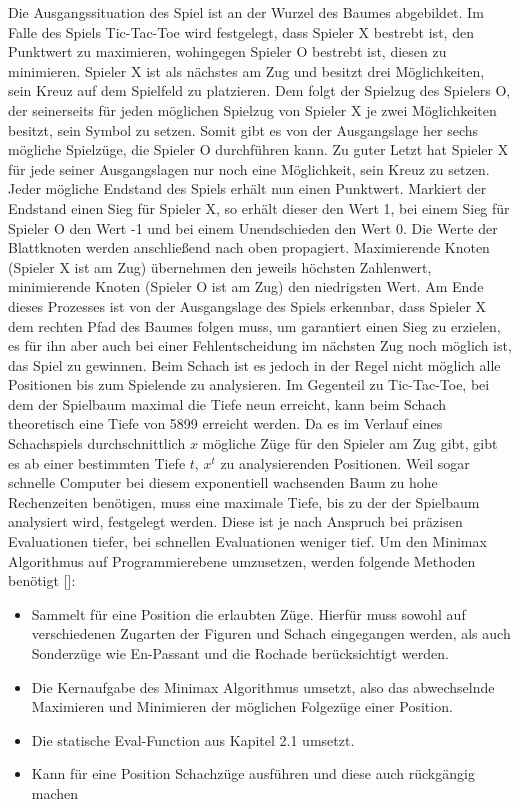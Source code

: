 Die Ausgangssituation des Spiel ist an der Wurzel des Baumes abgebildet.
Im Falle des Spiels Tic-Tac-Toe wird festgelegt, dass Spieler X bestrebt ist, den Punktwert zu maximieren, wohingegen Spieler O bestrebt ist, diesen zu minimieren.
Spieler X ist als nächstes am Zug und besitzt drei Möglichkeiten, sein Kreuz auf dem Spielfeld zu platzieren.
Dem folgt der Spielzug des Spielers O, der seinerseits für jeden möglichen Spielzug von Spieler X je zwei Möglichkeiten besitzt, sein Symbol zu setzen.
Somit gibt es von der Ausgangslage her sechs mögliche Spielzüge, die Spieler O durchführen kann.
Zu guter Letzt hat Spieler X für jede seiner Ausgangslagen nur noch eine Möglichkeit, sein Kreuz zu setzen.
Jeder mögliche Endstand des Spiels erhält nun einen Punktwert.
Markiert der Endstand einen Sieg für Spieler X, so erhält dieser den Wert 1, bei einem Sieg für Spieler O den Wert -1 und bei einem Unendschieden den Wert 0.
Die Werte der Blattknoten werden anschließend nach oben propagiert.
Maximierende Knoten (Spieler X ist am Zug) übernehmen den jeweils höchsten Zahlenwert, minimierende Knoten (Spieler O ist am Zug) den niedrigsten Wert.
Am Ende dieses Prozesses ist von der Ausgangslage des Spiels erkennbar, dass Spieler X dem rechten Pfad des Baumes folgen muss, um garantiert einen Sieg zu erzielen, es für ihn aber auch bei einer Fehlentscheidung im nächsten Zug noch möglich ist, das Spiel zu gewinnen.
Beim Schach ist es jedoch in der Regel nicht möglich alle Positionen bis zum Spielende zu analysieren.
Im Gegenteil zu Tic-Tac-Toe, bei dem der Spielbaum maximal die Tiefe neun erreicht, kann beim Schach theoretisch eine Tiefe von 5899 erreicht werden.
Da es im Verlauf eines Schachspiels durchschnittlich $x$ mögliche Züge für den Spieler am Zug gibt, gibt es ab einer bestimmten Tiefe $t$, $x^t$ zu analysierenden Positionen.
Weil sogar schnelle Computer bei diesem exponentiell wachsenden Baum zu hohe Rechenzeiten benötigen, muss eine maximale Tiefe, bis zu der der Spielbaum analysiert wird, festgelegt werden.
Diese ist je nach Anspruch bei präzisen Evaluationen tiefer, bei schnellen Evaluationen weniger tief.
Um den Minimax Algorithmus auf Programmierebene umzusetzen, werden folgende Methoden benötigt [\cite{Shannon1950}]:

\begin{itemize}
    \item Sammelt für eine Position die erlaubten Züge. Hierfür muss sowohl auf verschiedenen Zugarten der Figuren und Schach eingegangen werden, als auch Sonderzüge wie En-Passant und die Rochade berücksichtigt werden.
    \item Die Kernaufgabe des Minimax Algorithmus umsetzt, also das abwechselnde Maximieren und Minimieren der möglichen Folgezüge einer Position.
    \item Die statische Eval-Function aus Kapitel 2.1 umsetzt.
    \item Kann für eine Position Schachzüge ausführen und diese auch rückgängig machen
\end{itemize}

